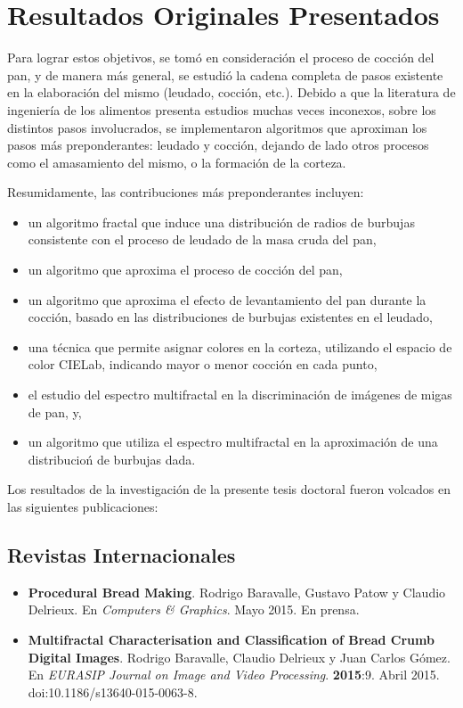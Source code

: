 \section{Resultados Originales Presentados}
Para lograr estos objetivos, se tomó en consideración el proceso de cocción del pan, y de manera más general, se estudió la cadena completa de pasos existente en la elaboración del mismo (leudado, cocción, etc.).
Debido a que la literatura de ingeniería de los alimentos presenta estudios muchas veces inconexos, sobre los distintos pasos involucrados, se implementaron algoritmos que aproximan los pasos más preponderantes: leudado y cocción, dejando de lado otros procesos como el amasamiento del mismo, o la formación de la corteza.

Resumidamente, las contribuciones más preponderantes incluyen:
\begin{itemize}
\item un algoritmo fractal que induce una distribución de radios de burbujas consistente con el proceso de leudado de la masa cruda del pan,
\item un algoritmo que aproxima el proceso de cocción del pan,
\item un algoritmo que aproxima el efecto de levantamiento del pan durante la cocción, basado en las distribuciones de burbujas existentes en el leudado,
\item una técnica que permite asignar colores en la corteza, utilizando el espacio de color CIELab, indicando mayor o menor cocción en cada punto,
\item el estudio del espectro multifractal en la discriminación de imágenes de migas de pan, y,
\item un algoritmo que utiliza el espectro multifractal en la aproximación de una distribucioń de burbujas dada.
\end{itemize}

Los resultados de la investigación de la presente tesis doctoral fueron volcados en las siguientes publicaciones:

\subsection*{Revistas Internacionales}

\begin{itemize}
\item {\bf Procedural Bread Making}. Rodrigo Baravalle, Gustavo Patow y Claudio Delrieux. En {\it Computers \& Graphics}. Mayo 2015. En prensa.

\item {\bf Multifractal Characterisation and Classification of Bread Crumb Digital Images}. Rodrigo Baravalle, Claudio Delrieux y Juan Carlos Gómez. En {\it EURASIP Journal on Image and Video Processing}. {\bf 2015}:9. Abril 2015. doi:10.1186/s13640-015-0063-8.
\end{itemize}


